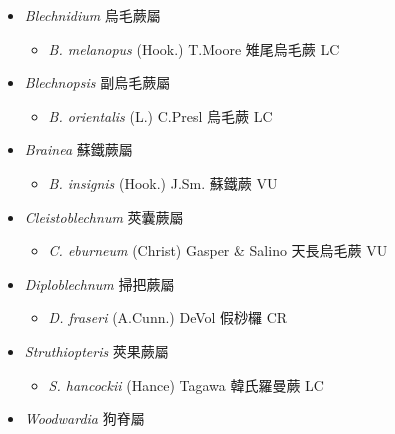 
  \begin{itemize}
 \item[] \textit{Blechnidium} 烏毛蕨屬
                                
  \begin{itemize}
        \item[] \textit{B. melanopus} (Hook.) T.Moore  雉尾烏毛蕨   LC
  \end{itemize}
 \item[] \textit{Blechnopsis} 副烏毛蕨屬
                                
  \begin{itemize}
        \item[] \textit{B. orientalis} (L.) C.Presl  烏毛蕨   LC
  \end{itemize}
 \item[] \textit{Brainea} 蘇鐵蕨屬
                                
  \begin{itemize}
        \item[] \textit{B. insignis} (Hook.) J.Sm.  蘇鐵蕨   VU
  \end{itemize}
 \item[] \textit{Cleistoblechnum} 莢囊蕨屬
                                
  \begin{itemize}
        \item[] \textit{C. eburneum} (Christ) Gasper \& Salino  天長烏毛蕨   VU
  \end{itemize}
 \item[] \textit{Diploblechnum} 掃把蕨屬
                                
  \begin{itemize}
        \item[] \textit{D. fraseri} (A.Cunn.) DeVol  假桫欏   CR
  \end{itemize}
 \item[] \textit{Struthiopteris} 莢果蕨屬
                                
  \begin{itemize}
        \item[] \textit{S. hancockii} (Hance) Tagawa  韓氏羅曼蕨   LC
  \end{itemize}
 \item[] \textit{Woodwardia} 狗脊屬
                                

\end{itemize}
